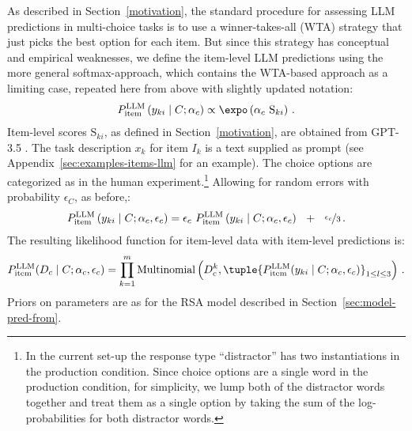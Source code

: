 \documentclass[fleqn]{article}
\begin{document}
As described in Section~\ref{motivation}, the standard procedure for assessing LLM predictions in multi-choice tasks is to use a winner-takes-all (WTA) strategy that just picks the best option for each item.
But since this strategy has conceptual and empirical weaknesses, we define the item-level LLM predictions using the more general softmax-approach, which contains the WTA-based approach as a limiting case, repeated here from above with slightly updated notation:
%
\begin{align*}
P_{\text{item}}^{\text{LLM}}\left ( y_{ki} \mid C; \alpha_{c} \right ) \propto \expo \left (\alpha_{c} \ \text{S}_{ki} \right)\,.
\end{align*}
%
Item-level scores $\text{S}_{ki}$, as defined in Section~\ref{motivation}, are obtained from GPT-3.5 .
The task description $x_{k}$ for item $I_{k}$ is a text supplied as prompt (see Appendix~\ref{sec:examples-items-llm} for an example).
The choice options are categorized as in the human experiment.\footnote{
  In the current set-up the response type ``distractor'' has two instantiations in the production condition. Since choice options are a single word in the production condition, for simplicity, we lump both of the distractor words together and treat them as a single option by taking the sum of the log-probabilities for both distractor words.}
Allowing for random errors with probability $\epsilon_{C}$, as before,:
%
\begin{align*}
  P_{\text{item}}^{\text{LLM}}\left ( y_{ki} \mid C; \alpha_{c}, \epsilon_{c} \right )
  = \epsilon_{c} \  P_{\text{item}}^{\text{LLM}}\left ( y_{ki} \mid C; \alpha_{c}, \epsilon_{c} \right ) \ \ + \ \ \nicefrac{\epsilon_{c}}{3}   \,.
\end{align*}
%
The resulting likelihood function for item-level data with item-level predictions is:
%
\begin{align*}
 P^{\text{LLM}}_{\text{item}}(D_{c} \mid C; \alpha_{c}, \epsilon_{c}) = \prod_{k = 1}^{m} \text{Multinomial} \left ( D_{c}^{k}, \tuple{P^{\text{LLM}}_{\text{item}}(y_{ki} \mid C;  \alpha_{c}, \epsilon_{c})}_{1 \le l \le 3} \right )\,.
\end{align*}
%
Priors on parameters are as for the RSA model described in Section~\ref{sec:model-pred-from}.
\end{document}
